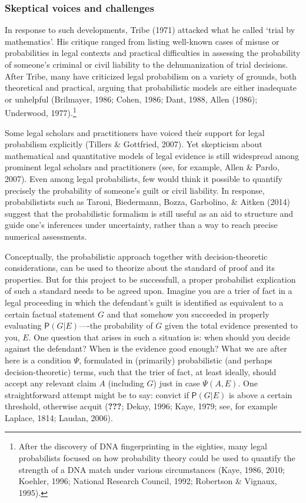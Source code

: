 \documentclass[11pt,dvipsnames,enabledeprecatedfontcommands]{scrartcl}
\newcommand{\pr}[1]{\mathsf{P}(#1)}
\begin{document}
\subsubsection{Skeptical voices and
challenges}\label{skeptical-voices-and-challenges}

In response to such developments, Tribe (1971) attacked what he called
`trial by mathematics'. His critique ranged from listing well-known
cases of misuse or probabilities in legal contexts and practical
difficulties in assessing the probability of someone's criminal or civil
liability to the dehumanization of trial decisions. After Tribe, many
have criticized legal probabilism on a variety of grounds, both
theoretical and practical, arguing that probabilistic models are either
inadequate or unhelpful (Brilmayer, 1986; Cohen, 1986; Dant, 1988, Allen
(1986); Underwood, 1977).\footnote{After the discovery of DNA
  fingerprinting in the eighties, many legal probabilists focused on how
  probability theory could be used to quantify the strength of a DNA
  match under various circumstances (Kaye, 1986, 2010; Koehler, 1996;
  National Research Council, 1992; Robertson \& Vignaux, 1995).}

Some legal scholars and practitioners have voiced their support for
legal probabilism explicitly (Tillers \& Gottfried, 2007). Yet
skepticism about mathematical and quantitative models of legal evidence
is still widespread among prominent legal scholars and practitioners
(see, for example, Allen \& Pardo, 2007). Even among legal probabilists,
few would think it possible to quantify precisely the probability of
someone's guilt or civil liability. In response, probabilistists such as
Taroni, Biedermann, Bozza, Garbolino, \& Aitken (2014) suggest that the
probabilistic formalism is still useful as an aid to structure and guide
one's inferences under uncertainty, rather than a way to reach precise
numerical assessments.

Conceptually, the probabilistic approach together with
decision-theoretic considerations, can be used to theorize about the
standard of proof and its properties. But for this project to be
successfull, a proper probabilist explication of such a standard needs
to be agreed upon. Imagine you are a trier of fact in a legal proceeding
in which the defendant's guilt is identified as equivalent to a certain
factual statement \(G\) and that somehow you succeeded in properly
evaluating \(\pr{G\vert E}\)----the probability of \(G\) given the total
evidence presented to you, \(E\). One question that arises in such a
situation is: when should you decide against the defendant? When is the
evidence good enough? What we are after here is a condition \(\Psi\),
formulated in (primarily) probabilistic (and perhaps decision-theoretic)
terms, such that the trier of fact, at least ideally, should accept any
relevant claim \(A\) (including \(G\)) just in case \(\Psi(A, E)\). One
straightforward attempt might be to say: convict if \(\pr{G\vert E}\) is
above a certain threshold, otherwise acquit ({\textbf{???}}; Dekay,
1996; Kaye, 1979; see, for example Laplace, 1814; Laudan, 2006).
\end{document}
